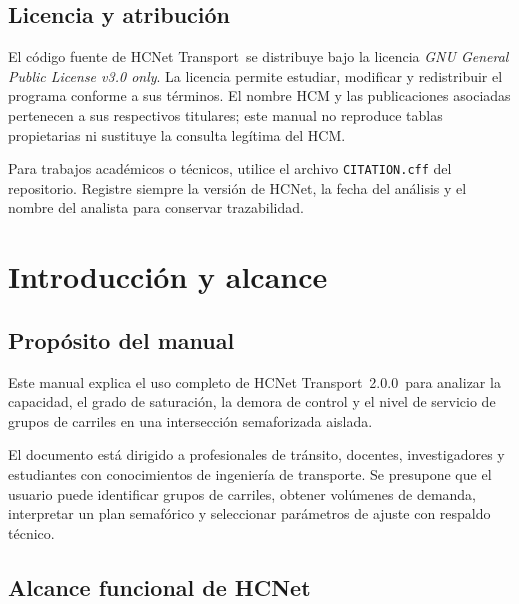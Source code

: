 \documentclass[11pt,letterpaper,oneside,openany]{report}
\newcommand{\softwareName}{HCNet Transport}
\newcommand{\softwareVersion}{2.0.0}
\begin{document}
\section*{Licencia y atribución}
{}

El código fuente de \softwareName\ se distribuye bajo la licencia
\textit{GNU General Public License v3.0 only}. La licencia permite estudiar,
modificar y redistribuir el programa conforme a sus términos. El nombre HCM y
las publicaciones asociadas pertenecen a sus respectivos titulares; este manual
no reproduce tablas propietarias ni sustituye la consulta legítima del HCM.

\begin{tipbox}
Para trabajos académicos o técnicos, utilice el archivo \texttt{CITATION.cff}
del repositorio. Registre siempre la versión de HCNet, la fecha del análisis y
el nombre del analista para conservar trazabilidad.
\end{tipbox}

\clearpage
\tableofcontents
\clearpage


\chapter{Introducción y alcance}

\section{Propósito del manual}

Este manual explica el uso completo de \softwareName\ \softwareVersion\ para
analizar la capacidad, el grado de saturación, la demora de control y el nivel de
servicio de grupos de carriles en una intersección semaforizada aislada.

El documento está dirigido a profesionales de tránsito, docentes, investigadores
y estudiantes con conocimientos de ingeniería de transporte. Se presupone que
el usuario puede identificar grupos de carriles, obtener volúmenes de demanda,
interpretar un plan semafórico y seleccionar parámetros de ajuste con respaldo
técnico.

\section{Alcance funcional de HCNet}
\end{document}
